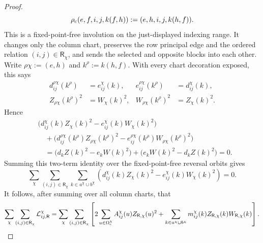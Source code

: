 \documentclass[11pt]{article}
\begin{document}
\begin{proof}
\[
\rho_{\rm c}(e,f,i,j,k(f,h))
:=(e,h,i,j,k(h,f)).
\]
This is a fixed-point-free involution on the just-displayed indexing range.  It
changes only the column chart, preserves the row principal edge and the
ordered relation $(i,j)\in\mathsf R_\chi$, and sends
the selected and opposite blocks into each other.  Write
$\rho\chi:=(e,h)$ and $k^\rho:=k(h,f)$.  With every chart decoration
exposed, this says
\[
\begin{aligned}
d_{ij}^{\rho\chi}(k^\rho)&=e_{ij}^{\chi}(k),&
e_{ij}^{\rho\chi}(k^\rho)&=d_{ij}^{\chi}(k),\\
Z_{\rho\chi}(k^\rho)^2&=W_\chi(k)^2,&
W_{\rho\chi}(k^\rho)^2&=Z_\chi(k)^2.
\end{aligned}
\]
Hence
\[
\begin{aligned}
&\bigl(d_{ij}^{\chi}(k)Z_\chi(k)^2
       -e_{ij}^{\chi}(k)W_\chi(k)^2\bigr)\\
&\quad+
\bigl(d_{ij}^{\rho\chi}(k^\rho)Z_{\rho\chi}(k^\rho)^2
       -e_{ij}^{\rho\chi}(k^\rho)W_{\rho\chi}(k^\rho)^2\bigr)\\
&\quad=
\bigl(d_kZ(k)^2-e_kW(k)^2\bigr)
+\bigl(e_kW(k)^2-d_kZ(k)^2\bigr)=0.
\end{aligned}
\]
Summing this two-term identity over the fixed-point-free reversal orbits
gives
\begin{equation}\label{eq:direct-endpoint-face-cancellation}
 \sum_{\chi}\sum_{(i,j)\in\mathsf R_\chi}
 \sum_{k\in a^\chi\cup b^\chi}
 \left(d_{ij}^{\chi}(k)Z_\chi(k)^2
       -e_{ij}^{\chi}(k)W_\chi(k)^2\right)=0.
\tag{A.29e}
\end{equation}
It follows, after summing over all column charts, that
\[
 \sum_\chi\sum_{(i,j)\in\mathsf R_\chi}
 \mathcal L_{ij,\mathsf R}^{\chi}
 =\sum_\chi\sum_{(i,j)\in\mathsf R_\chi}\left[
 2\sum_{u\in\Omega_{\rm c}^\chi}
 A_{ij}^{\chi}(u)Z_{\mathsf R,\chi}(u)^2
 +\sum_{k\in a^\chi\cup b^\chi}
 m_{ij}^{\chi}(k)Z_{\mathsf R,\chi}(k)W_{\mathsf R,\chi}(k)
 \right].
\]


\end{proof}
\end{document}
